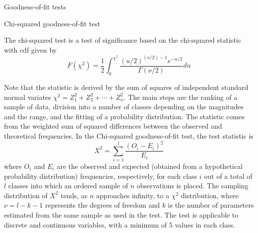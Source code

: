 \documentclass[8pt]{beamer}
\renewcommand{\emph}[1]{\textcolor{myorange}{#1}}
\begin{document}
\begin{frame}{Goodness-of-fit tests}

    \begin{block}{Chi-squared goodness-of-fit test}
    \end{block}

    The \alert{chi-squared test} is a \emph{test of significance} based on the \emph{chi-squared statistic} with \emph{cdf} given by
    \[
        F(\chi^2) = \frac{1}{2} \int_0^{\chi^2} \frac{(u/2)^{(\nu/2)-1} e^{-u/2}}{\Gamma(\nu/2)} du
    \]

    Note that the \emph{statistic} is derived by the sum of squares of \emph{independent standard normal variates} $\chi^2 = Z_1^2 + Z_2^2 + \cdots + Z_n^2$. The main steps are the \emph{ranking of a sample of data}, \emph{division into a number of classes} depending on the magnitudes and the range, and the \emph{fitting of a probability distribution}. The statistic comes from the weighted sum of squared differences between the observed and theoretical frequencies.
    In the \alert{Chi-squared goodness-of-fit test},  the test statistic is
    \[
        X^2 = \sum_{i=1}^l \frac{(O_i - E_i)^2}{E_i}
    \]
    where $O_i$ and $E_i$ are the \emph{observed} and \emph{expected} (obtained from a hypothetical probability distribution) frequencies, respectively, for each class $i$ out of a total of $l$ classes into which an ordered sample of $n$ observations is placed. The \emph{sampling distribution} of $X^2$ tends, as $n$ approaches infinity, to a $\chi^2$ distribution, where $\nu = l - k - 1$ represents the \emph{degrees of freedom} and $k$ is the number of parameters estimated from the same sample as used in the test. The test is applicable to \emph{discrete and continuous variables}, with a minimum of 5 values in each class.
    \end{frame}
\end{document}
